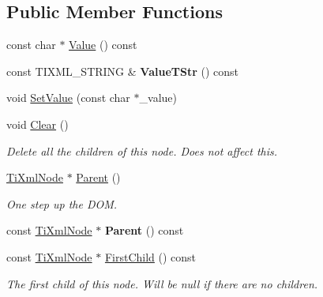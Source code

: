 \subsection*{Public Member Functions}
\begin{DoxyCompactItemize}
\item 
const char $\ast$ \hyperlink{classTiXmlNode_ad44dfe927d49a74dd78b72b7514417ad}{Value} () const
\item 
\mbox{\label{classTiXmlNode_a74c4ea4a91c0a91900c919f69f657d6a}} 
const T\+I\+X\+M\+L\+\_\+\+S\+T\+R\+I\+NG \& {\bfseries Value\+T\+Str} () const
\item 
void \hyperlink{classTiXmlNode_a2a38329ca5d3f28f98ce932b8299ae90}{Set\+Value} (const char $\ast$\+\_\+value)
\item 
\mbox{\label{classTiXmlNode_a708e7f953df61d4d2d12f73171550a4b}} 
void \hyperlink{classTiXmlNode_a708e7f953df61d4d2d12f73171550a4b}{Clear} ()
\begin{DoxyCompactList}\small\item\em Delete all the children of this node. Does not affect \textquotesingle{}this\textquotesingle{}. \end{DoxyCompactList}\item 
\mbox{\label{classTiXmlNode_ab643043132ffd794f8602685d34a982e}} 
\hyperlink{classTiXmlNode}{Ti\+Xml\+Node} $\ast$ \hyperlink{classTiXmlNode_ab643043132ffd794f8602685d34a982e}{Parent} ()
\begin{DoxyCompactList}\small\item\em One step up the D\+OM. \end{DoxyCompactList}\item 
\mbox{\label{classTiXmlNode_af13df38878a5798142693d01d6133ba0}} 
const \hyperlink{classTiXmlNode}{Ti\+Xml\+Node} $\ast$ {\bfseries Parent} () const
\item 
\mbox{\label{classTiXmlNode_aa66bceae19707c90c1db12d7c98894a4}} 
const \hyperlink{classTiXmlNode}{Ti\+Xml\+Node} $\ast$ \hyperlink{classTiXmlNode_aa66bceae19707c90c1db12d7c98894a4}{First\+Child} () const
\begin{DoxyCompactList}\small\item\em The first child of this node. Will be null if there are no children. \end{DoxyCompactList}\item 

\end{DoxyCompactItemize}
